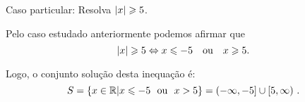 \begin{exem}
\begin{comment}
\begin{equation*}
\abs{x} > a \Leftrightarrow \abs{x}^2 > a^2 \Leftrightarrow x^2 > a^2
\end{equation*}
   mas,
\begin{equation*}
x^2 > a^2 \Leftrightarrow x^2 - a^2 > 0 \Leftrightarrow (x-a)(x+a) > 0 \ .
\end{equation*}
   Vamos então analisar quando $(x-a)(x+a) > 0$. Lembremos que produto de dois números é positivo quando eles tem o mesmo sinal, com isso a inequação $(x-a)(x+a) > 0$ é satisfeita em duas situações:\\
   Caso 1: $x-a< 0$ e $x+a< 0$
\begin{equation*}
x-a< 0 \Rightarrow x< a
\end{equation*}
   e
\begin{equation*}
x+a< 0 \Rightarrow x< -a \ .
\end{equation*}
  Fazendo a interseção dos conjuntos $A_1= \left\{ x \in \R \mid x<a \right\}$ e $B_1= \left\{ x \in \R \mid x< -a \right\}$, obtemos $A_1 \cap B_1= \left\{ x \in \R \mid x< -a \right\}$. O conjunto $A_1 \cap B_1$ é o conjunto solução da inequação neste caso.


   Caso 2: $x-a> 0$ e $x+a> 0$
\begin{equation*}
x-a> 0 \Rightarrow x> a
\end{equation*}
   e
\begin{equation*}
x+a> 0 \Rightarrow x> -a 
\end{equation*}
   Fazendo a interseção dos conjuntos $A_2= \left\{ x \in \R \mid x> a \right\}$ e $B_2= \left\{ x \in \R \mid x> -a \right\}$, obtemos $A_2 \cap B_2= \left\{ x \in \R \mid x> a \right\}$. O conjunto $A_2 \cap B_2$ é o conjunto solução da inequação neste caso.

   Agora fazendo $S= (A_1 \cap B_1) \cup (A_2 \cap B_2)$ obtemos que $S= \left\{ x \in \R \mid x<-a \text{ ou } x> a \right\}$ é o conjunto solução da inequação $\abs{x} > a$.

  Portanto $\abs{x} > a \Leftrightarrow x<-a \text{ ou } x> a$.
\end{comment}
\end{exem}

\begin{exem}
   Caso particular: Resolva $\left|x\right| \geqslant 5$.

Pelo caso estudado anteriormente podemos afirmar que \begin{equation*}
\abs{x} \geq 5 \Leftrightarrow x \leq -5 \ \ \text{ ou } \ \ x \geq 5.
\end{equation*}
   
Logo, o conjunto solução desta inequação é:
\begin{equation*}
S= \{x \in \mathbb{R}| x \leqslant -5 \ \ \mbox{ou} \ \ x > 5\}= (-\infty, -5] \cup [5, \infty) \ . 
\end{equation*}
 \end{exem}
 
